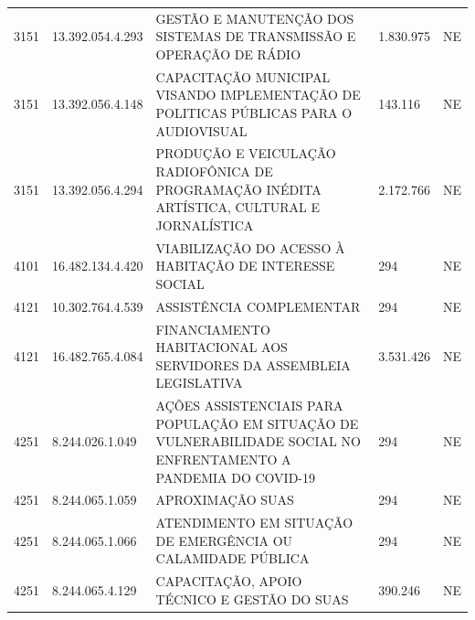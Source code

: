 \documentclass{article}
\begin{document}
\begin{longtable}[c]{m{1cm}|m{2cm}|m{10cm}|m{2cm}|m{1cm}}
\multicolumn{1}{C{1cm}|}{3151} & \multicolumn{1}{C{2cm}|}{13.392.054.4.293} & \multicolumn{1}{L{10cm}|}{GESTÃO E MANUTENÇÃO DOS SISTEMAS DE TRANSMISSÃO E OPERAÇÃO DE RÁDIO} & \multicolumn{1}{R{2cm}|}{1.830.975} & \multicolumn{1}{C{1cm}}{NE} \\
\multicolumn{1}{C{1cm}|}{3151} & \multicolumn{1}{C{2cm}|}{13.392.056.4.148} & \multicolumn{1}{L{10cm}|}{CAPACITAÇÃO MUNICIPAL VISANDO IMPLEMENTAÇÃO DE POLITICAS PÚBLICAS PARA O AUDIOVISUAL} & \multicolumn{1}{R{2cm}|}{143.116} & \multicolumn{1}{C{1cm}}{NE} \\
\multicolumn{1}{C{1cm}|}{3151} & \multicolumn{1}{C{2cm}|}{13.392.056.4.294} & \multicolumn{1}{L{10cm}|}{PRODUÇÃO E VEICULAÇÃO RADIOFÔNICA DE PROGRAMAÇÃO INÉDITA ARTÍSTICA, CULTURAL E JORNALÍSTICA} & \multicolumn{1}{R{2cm}|}{2.172.766} & \multicolumn{1}{C{1cm}}{NE} \\
\multicolumn{1}{C{1cm}|}{4101} & \multicolumn{1}{C{2cm}|}{16.482.134.4.420} & \multicolumn{1}{L{10cm}|}{VIABILIZAÇÃO DO ACESSO À HABITAÇÃO DE INTERESSE SOCIAL} & \multicolumn{1}{R{2cm}|}{294} & \multicolumn{1}{C{1cm}}{NE} \\
\multicolumn{1}{C{1cm}|}{4121} & \multicolumn{1}{C{2cm}|}{10.302.764.4.539} & \multicolumn{1}{L{10cm}|}{ASSISTÊNCIA COMPLEMENTAR} & \multicolumn{1}{R{2cm}|}{294} & \multicolumn{1}{C{1cm}}{NE} \\
\multicolumn{1}{C{1cm}|}{4121} & \multicolumn{1}{C{2cm}|}{16.482.765.4.084} & \multicolumn{1}{L{10cm}|}{FINANCIAMENTO HABITACIONAL AOS SERVIDORES DA ASSEMBLEIA LEGISLATIVA} & \multicolumn{1}{R{2cm}|}{3.531.426} & \multicolumn{1}{C{1cm}}{NE} \\
\multicolumn{1}{C{1cm}|}{4251} & \multicolumn{1}{C{2cm}|}{8.244.026.1.049} & \multicolumn{1}{L{10cm}|}{AÇÕES ASSISTENCIAIS PARA POPULAÇÃO EM SITUAÇÃO DE VULNERABILIDADE SOCIAL NO ENFRENTAMENTO A PANDEMIA DO COVID-19} & \multicolumn{1}{R{2cm}|}{294} & \multicolumn{1}{C{1cm}}{NE} \\
\multicolumn{1}{C{1cm}|}{4251} & \multicolumn{1}{C{2cm}|}{8.244.065.1.059} & \multicolumn{1}{L{10cm}|}{APROXIMAÇÃO SUAS} & \multicolumn{1}{R{2cm}|}{294} & \multicolumn{1}{C{1cm}}{NE} \\
\multicolumn{1}{C{1cm}|}{4251} & \multicolumn{1}{C{2cm}|}{8.244.065.1.066} & \multicolumn{1}{L{10cm}|}{ATENDIMENTO EM SITUAÇÃO DE EMERGÊNCIA OU CALAMIDADE PÚBLICA} & \multicolumn{1}{R{2cm}|}{294} & \multicolumn{1}{C{1cm}}{NE} \\
\multicolumn{1}{C{1cm}|}{4251} & \multicolumn{1}{C{2cm}|}{8.244.065.4.129} & \multicolumn{1}{L{10cm}|}{CAPACITAÇÃO, APOIO TÉCNICO E GESTÃO DO SUAS} & \multicolumn{1}{R{2cm}|}{390.246} & \multicolumn{1}{C{1cm}}{NE} \\

\end{longtable}
\end{document}
